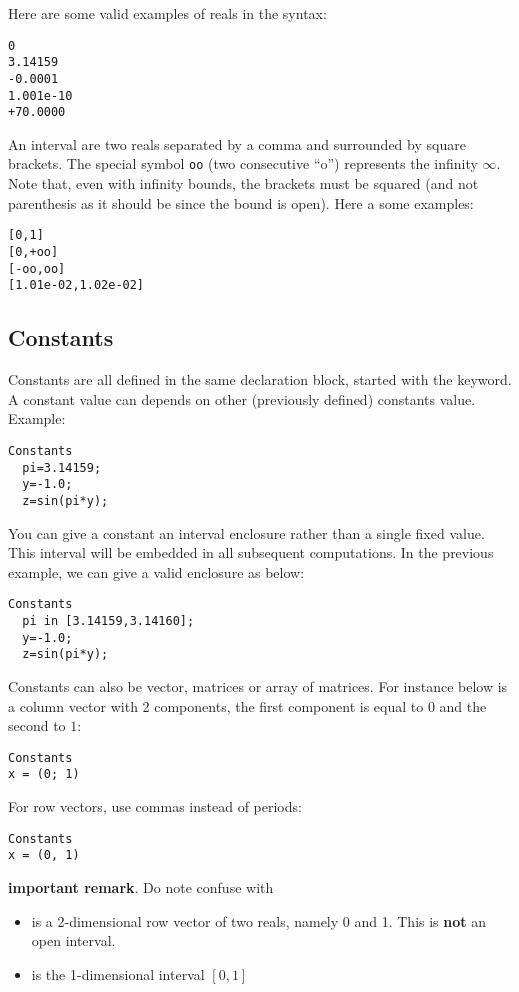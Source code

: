 Here are some valid examples of reals in the syntax:
\begin{verbatim}
0
3.14159
-0.0001
1.001e-10
+70.0000
\end{verbatim}
 
An interval are two reals separated by a comma
and surrounded by square brackets. The special symbol
{\tt oo} (two consecutive ``o'') represents the infinity $\infty$.
Note that, even with infinity bounds, the brackets
must be squared (and not parenthesis as it should be since the
bound is open). Here a some examples:

\begin{verbatim}
[0,1]
[0,+oo]
[-oo,oo]
[1.01e-02,1.02e-02]
\end{verbatim}

\subsection{Constants}
Constants are all defined in the same declaration block, 
started with the  keyword.
A constant value can depends on other (previously defined) constants value. Example:

\begin{verbatim}
Constants
  pi=3.14159;
  y=-1.0;
  z=sin(pi*y);
\end{verbatim} 

You can give a constant an interval enclosure rather than a single fixed value.
This interval will be embedded in all subsequent computations.
In the previous example, we can give  a valid enclosure as below:

\begin{verbatim}
Constants
  pi in [3.14159,3.14160];
  y=-1.0;
  z=sin(pi*y);
\end{verbatim}

Constants can also be vector, matrices or array of matrices.
For instance  below is a column vector with 2 components, the first component is equal
to $0$ and the second to $1$:
\begin{verbatim}
Constants
x = (0; 1)
\end{verbatim}
For row vectors, use commas instead of periods:
\begin{verbatim}
Constants
x = (0, 1)
\end{verbatim}

{\bf important remark}. Do note confuse
\cf{[0,1]} with 
\begin{itemize}
\item {} is a 2-dimensional row vector of two reals, namely 0 and 1.
This is {\bf not} an open interval.
\item \cf{[0,1]} is the 1-dimensional interval $[0,1]$
\end{itemize}

